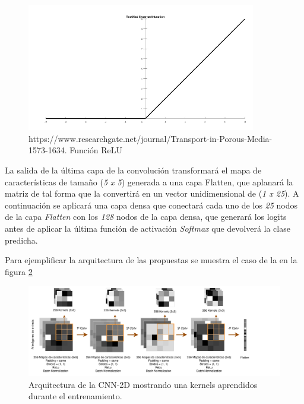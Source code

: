 \begin{enumerate}
                \begin{figure}[h]
                    \centering
                    \includegraphics[width=10cm]{archivos/4.Metodologia/Modelos/CNN/RELUImage}
                    \caption{https://www.researchgate.net/journal/Transport-in-Porous-Media-1573-1634. Función ReLU}
                    \label{RELUImage}
                 \end{figure}

                La salida de la última capa de la convolución transformará el mapa de características de tamaño (\textit{5 x 5}) generada a una capa Flatten, que aplanará la matriz de tal forma que la convertirá en un vector unidimensional de (\textit{1 x 25}). A continuación se aplicará una capa densa que conectará cada uno de los \textit{25} nodos de la capa \textit{Flatten} con los \textit{128} nodos de la capa densa, que generará los logits antes de aplicar la última función de activación \textit{Softmax} que devolverá la clase predicha.


                Para ejemplificar la arquitectura de las  propuestas se muestra el caso de la  en la figura \ref{TASPCNNIMAGE}


                \begin{figure}[h]
                    \centering
                    \includegraphics[width=17cm]{archivos/4.Metodologia/Modelos/CNN/2D/TASPCNN}
                    \caption{Arquitectura de la CNN-2D mostrando una  kernels aprendidos durante el entrenamiento.}
                    \label{TASPCNNIMAGE}
                 \end{figure}


        \end{enumerate}

        \cite{AutoSklearn}

\newpage
